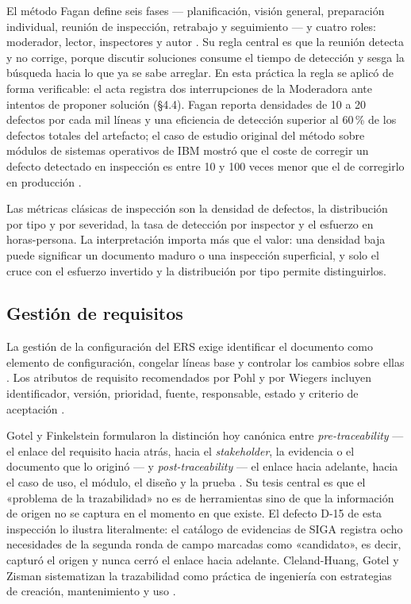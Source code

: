 \documentclass[11pt,letterpaper]{article}
\begin{document}
El método Fagan define seis fases --- planificación, visión general, preparación individual, reunión de inspección, retrabajo y seguimiento --- y cuatro roles: moderador, lector, inspectores y autor \cite{fagan1976}. Su regla central es que la reunión detecta y no corrige, porque discutir soluciones consume el tiempo de detección y sesga la búsqueda hacia lo que ya se sabe arreglar. En esta práctica la regla se aplicó de forma verificable: el acta registra dos interrupciones de la Moderadora ante intentos de proponer solución (\S4.4). Fagan reporta densidades de 10 a 20 defectos por cada mil líneas y una eficiencia de detección superior al 60\,\% de los defectos totales del artefacto; el caso de estudio original del método sobre módulos de sistemas operativos de IBM mostró que el coste de corregir un defecto detectado en inspección es entre 10 y 100 veces menor que el de corregirlo en producción \cite{fagan1976}.

Las métricas clásicas de inspección son la densidad de defectos, la distribución por tipo y por severidad, la tasa de detección por inspector y el esfuerzo en horas-persona. La interpretación importa más que el valor: una densidad baja puede significar un documento maduro o una inspección superficial, y solo el cruce con el esfuerzo invertido y la distribución por tipo permite distinguirlos.

\subsection{Gestión de requisitos}
La gestión de la configuración del ERS exige identificar el documento como elemento de configuración, congelar líneas base y controlar los cambios sobre ellas \cite{iso12207}. Los atributos de requisito recomendados por Pohl y por Wiegers incluyen identificador, versión, prioridad, fuente, responsable, estado y criterio de aceptación \cite{pohl2025,wiegers2013}.

Gotel y Finkelstein formularon la distinción hoy canónica entre \emph{pre-traceability} --- el enlace del requisito hacia atrás, hacia el \emph{stakeholder}, la evidencia o el documento que lo originó --- y \emph{post-traceability} --- el enlace hacia adelante, hacia el caso de uso, el módulo, el diseño y la prueba \cite{gotel1994}. Su tesis central es que el «problema de la trazabilidad» no es de herramientas sino de que la información de origen no se captura en el momento en que existe. El defecto D-15 de esta inspección lo ilustra literalmente: el catálogo de evidencias de SIGA registra ocho necesidades de la segunda ronda de campo marcadas como «candidato», es decir, capturó el origen y nunca cerró el enlace hacia adelante. Cleland-Huang, Gotel y Zisman sistematizan la trazabilidad como práctica de ingeniería con estrategias de creación, mantenimiento y uso \cite{clelandhuang2012}.
\end{document}
